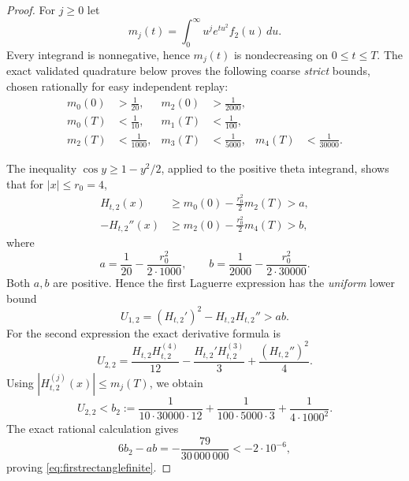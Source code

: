 \begin{proof}
For $j\ge0$ let
\[
m_j(t)=\int_0^\infty
u^j e^{tu^2}f_2(u)\,du .
\]
Every integrand is nonnegative, hence
$m_j(t)$ is nondecreasing on $0\le t\le T$.
The exact validated quadrature below proves
the following coarse \emph{strict} bounds,
chosen rationally for easy independent replay:
\begin{align}
m_0(0)&>\frac1{20},
&m_2(0)&>\frac1{2000},\nonumber\\
m_0(T)&<\frac1{10},
&m_1(T)&<\frac1{100},\nonumber\\
m_2(T)&<\frac1{1000},
&m_3(T)&<\frac1{5000},
&m_4(T)&<\frac1{30000}.
\label{eq:rectangle-moment-bounds}
\end{align}

The inequality $\cos y\ge1-y^2/2$,
applied to the positive theta integrand,
shows that for $|x|\le r_0=4$,
\begin{align*}
H_{t,2}(x)&\ge
m_0(0)-\frac{r_0^2}{2}m_2(T)>a,\\
-H_{t,2}''(x)&\ge
m_2(0)-\frac{r_0^2}{2}m_4(T)>b,
\end{align*}
where
\[
a=\frac1{20}-\frac{r_0^2}{2\cdot1000},
\qquad
b=\frac1{2000}-\frac{r_0^2}{2\cdot30000}.
\]
Both $a,b$ are positive. Hence the
first Laguerre expression has the
\emph{uniform} lower bound
\begin{equation}
U_{1,2}=(H_{t,2}')^2-H_{t,2}H_{t,2}''
>ab.
\label{eq:rectangle-U1}
\end{equation}
For the second expression the exact
derivative formula is
\[
U_{2,2}=
\frac{H_{t,2}H_{t,2}^{(4)}}{12}
-\frac{H_{t,2}'H_{t,2}^{(3)}}3
+\frac{(H_{t,2}'')^2}{4}.
\]
Using $|H_{t,2}^{(j)}(x)|\le m_j(T)$,
we obtain
\begin{equation}
U_{2,2}<
b_2:=\frac{1}{10\cdot30000\cdot12}
+\frac{1}{100\cdot5000\cdot3}
+\frac{1}{4\cdot1000^2}.
\label{eq:rectangle-U2}
\end{equation}
The exact rational calculation gives
\[
6b_2-ab=-\frac{79}{30\,000\,000}
<-2\cdot10^{-6},
\]
proving \eqref{eq:firstrectanglefinite}.


\end{proof}
